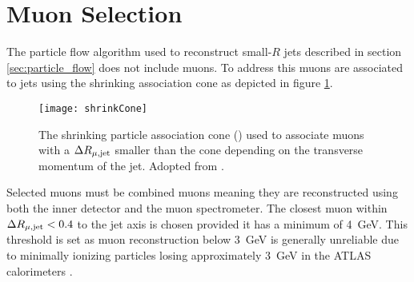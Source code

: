 \section{Muon Selection}
\label{sec:MuonSelection}
The particle flow algorithm used to reconstruct small-$R$ jets described in section \ref{sec:particle_flow} does not include muons. To address this muons are associated to jets using the shrinking association \DeltaR cone as depicted in figure \ref{fig:shrinkCone}.
\begin{figure}[htbp]
  \centering
  \texttt{[image: shrinkCone]}
  \caption{The shrinking particle association cone () used to associate muons with a $\Delta R_\mathrm{\mu, jet}$ smaller than the cone depending on the transverse momentum of the jet. Adopted from \citep{Jacobs:2697316}. }
  \label{fig:shrinkCone}
\end{figure}
Selected muons must be combined muons meaning they are reconstructed using both the inner detector and the muon spectrometer. The closest muon within $\Delta R_\mathrm{\mu, jet} < 0.4$ to the jet axis is chosen provided it has a minimum \pt of \qty{4}{GeV}. This threshold is set as muon reconstruction below \qty{3}{GeV} is generally unreliable due to minimally ionizing particles losing approximately \qty{3}{GeV} in the ATLAS calorimeters \citep{expectedPerformanceAtlas}.

